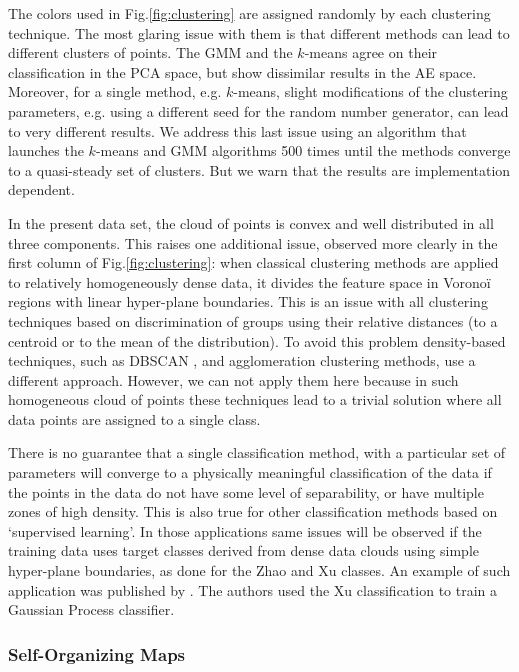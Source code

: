 \documentclass[utf8]{frontiersSCNS} %
\begin{document}
The colors used in Fig.\ref{fig:clustering} are assigned randomly by each clustering technique. The most glaring issue with them is that different methods can lead to different clusters of points. The GMM and the $k$-means agree on their classification in the PCA space, but show dissimilar results in the AE space. Moreover, for a single method, e.g. $k$-means, slight modifications of the clustering parameters, e.g. using a different seed for the random number generator, can lead to very different results. We address this last issue using an algorithm that launches the $k$-means and GMM algorithms 500 times until the methods converge to a quasi-steady set of clusters. But we warn that the results are implementation dependent.

In the present data set, the cloud of points is convex and well distributed in all three components. This raises one additional issue, observed more clearly in the first column of Fig.\ref{fig:clustering}: when classical clustering methods are applied to relatively homogeneously dense data, it divides the feature space in Vorono\"i regions with linear hyper-plane boundaries. This is an issue with all clustering techniques based on discrimination of groups using their relative distances (to a centroid or to the mean of the distribution). To avoid this problem density-based techniques, such as DBSCAN \citep{ester1996density}, and agglomeration clustering methods, use a different approach. However, we can not apply them here because in such homogeneous cloud of points these techniques lead to a trivial solution where all data points are assigned to a single class.

There is no guarantee that a single classification method, with a particular set of parameters will converge to a physically meaningful classification of the data if the points in the data do not have some level of separability, or have multiple zones of high density. This is also true for other classification methods based on `supervised learning'. In those applications same issues will be observed if the training data uses target classes derived from dense data clouds using simple hyper-plane boundaries, as done for the Zhao and Xu classes. An example of such application was published by \citep{Camporeale2017b}. The authors used the Xu classification to train a Gaussian Process classifier.

\subsubsection{Self-Organizing Maps}
\label{sec:som}
\end{document}
